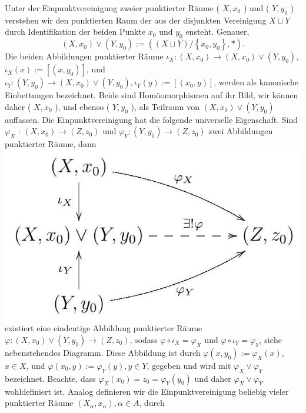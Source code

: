 \documentclass[10pt, letterpaper]{article}
\begin{document}
Unter der Einpunktvereinigung zweier punktierter Räume ( $X, x_{0}$ ) und ( $Y, y_{0}$ ) verstehen wir den punktierten Raum der aus der disjunkten Vereinigung $X \sqcup Y$ durch Identifikation der beiden Punkte $x_{0}$ und $y_{0}$ ensteht. Genauer,
$$
\left(X, x_{0}\right) \vee\left(Y, y_{0}\right):=\left((X \sqcup Y) /\left\{x_{0}, y_{0}\right\}, *\right) .
$$
Die beiden Abbildungen punktierter Räume $\iota_{X}:\left(X, x_{0}\right) \rightarrow\left(X, x_{0}\right) \vee\left(Y, y_{0}\right)$, $\iota_{X}(x):=\left[\left(x, y_{0}\right)\right]$, und $\iota_{Y}:\left(Y, y_{0}\right) \rightarrow\left(X, x_{0}\right) \vee\left(Y, y_{0}\right), \iota_{Y}(y):=\left[\left(x_{0}, y\right)\right]$, werden als kanonische Einbettungen bezeichnet. Beide sind Homöomorphismen auf ihr Bild, wir können daher ( $X, x_{0}$ ), und ebenso ( $Y, y_{0}$ ), als Teilraum von $\left(X, x_{0}\right) \vee\left(Y, y_{0}\right)$ auffassen. Die Einpunktvereinigung hat die folgende universelle Eigenschaft. Sind $\varphi_{X}$ : $\left(X, x_{0}\right) \rightarrow\left(Z, z_{0}\right)$ und $\varphi_{Y}:\left(Y, y_{0}\right) \rightarrow\left(Z, z_{0}\right)$ zwei Abbildungen punktierter Räume, dann\\
\includegraphics[max width=\textwidth]{2025_06_05_d7ed2bacd1e9ce1db1f0g-031} existiert eine eindeutige Abbildung punktierter Räume $\varphi:\left(X, x_{0}\right) \vee\left(Y, y_{0}\right) \rightarrow\left(Z, z_{0}\right)$, sodass $\varphi \circ \iota_{X}=\varphi_{X}$ und $\varphi \circ \iota_{Y}=\varphi_{Y}$, siehe nebenstehendes Diagramm. Diese Abbildung ist durch $\varphi\left(x, y_{0}\right):=\varphi_{X}(x)$, $x \in X$, und $\varphi\left(x_{0}, y\right):=\varphi_{Y}(y), y \in Y$, gegeben und wird mit $\varphi_{X} \vee \varphi_{Y}$ bezeichnet. Beachte, dass $\varphi_{X}\left(x_{0}\right)=z_{0}=\varphi_{Y}\left(y_{0}\right)$ und daher $\varphi_{X} \vee \varphi_{Y}$ wohldefiniert ist. Analog definieren wir die Einpunktvereinigung beliebig vieler punktierter Räume $\left(X_{\alpha}, x_{\alpha}\right), \alpha \in A$, durch
\end{document}

